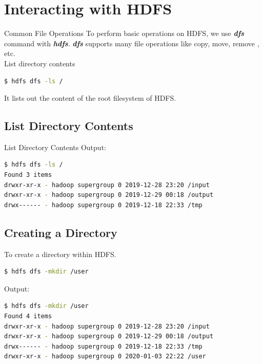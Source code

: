\documentclass[pdf]{beamer}
\begin{document}
\section{Interacting with HDFS}
\begin{frame}[fragile]{Common File Operations}
\noindent To perform basic operations on HDFS, we use \textbf{\emph{dfs}} command with \textbf{\emph{hdfs}}.
\textbf{\emph{dfs}} supports many file operations like copy, move, remove , etc. \\
List directory contents
\begin{lstlisting}[language=bash]
  $ hdfs dfs -ls /
\end{lstlisting}
It lists out the content of the root filesystem of HDFS.

\end{frame}
\subsection{List Directory Contents}
\begin{frame}[fragile]{List Directory Contents}
Output: 
\begin{lstlisting}[language=bash]
$ hdfs dfs -ls /
Found 3 items
drwxr-xr-x - hadoop supergroup 0 2019-12-28 23:20 /input
drwxr-xr-x - hadoop supergroup 0 2019-12-29 00:18 /output
drwx------ - hadoop supergroup 0 2019-12-18 22:33 /tmp
\end{lstlisting}

\end{frame}


\subsection{Creating a Directory}
\begin{frame}[fragile]{}
To create a directory within HDFS.
\begin{lstlisting}[language=bash]
$ hdfs dfs -mkdir /user
\end{lstlisting}

Output: 
\begin{lstlisting}[language=bash]
$ hdfs dfs -mkdir /user
Found 4 items
drwxr-xr-x - hadoop supergroup 0 2019-12-28 23:20 /input
drwxr-xr-x - hadoop supergroup 0 2019-12-29 00:18 /output
drwx------ - hadoop supergroup 0 2019-12-18 22:33 /tmp
drwxr-xr-x - hadoop supergroup 0 2020-01-03 22:22 /user
\end{lstlisting}
\end{frame}
\end{document}
